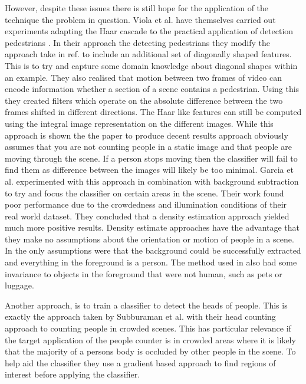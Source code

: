 \documentclass[conference]{IEEEtran}
\begin{document}
However, despite these issues there is still hope for the application of the technique the problem in question. Viola et al. have themselves carried out experiments adapting the Haar cascade to the practical application of detection pedestrians \cite{viola2003detecting}. In their approach the detecting pedestrians they modify the approach take in ref. \cite{viola2004robust} to include an additional set of diagonally shaped features. This is to try and capture some domain knowledge about diagonal shapes within an example. They also realised that motion between two frames of video can encode information whether a section of a scene contains a pedestrian. Using this they created filters which operate on the absolute difference between the two frames shifted in different directions. The Haar like features can still be computed using the integral image representation on the different images. While this approach is shown the the paper to produce decent results approach obviously assumes that you are not counting people in a static image and that people are moving through the scene. If a person stops moving then the classifier will fail to find them as difference between the images will likely be too minimal. Garcia et al. \cite{garcia2008effective} experimented with this approach in combination with background subtraction to try and focus the classifier on certain areas in the scene. Their work found poor performance due to the crowdedness and illumination conditions of their real world dataset. They concluded that a density estimation approach yielded much more positive results. Density estimate approaches have the advantage that they make no assumptions about the orientation or motion of people in a scene. In \cite{garcia2008effective} the only assumptions were that the background could be successfully extracted and everything in the foreground is a person. The method used in \cite{garcia2008effective} also had some invariance to objects in the foreground that were not human, such as pets or luggage.

Another approach, is to train a classifier to detect the heads of people. This is exactly the approach taken by Subburaman et al. \cite{subburaman2012counting} with their head counting approach to counting people in crowded scenes. This has particular relevance if the target application of the people counter is in crowded areas where it is likely that the majority of a persons body is occluded by other people in the scene. To help aid the classifier they use a gradient based approach to find regions of interest before applying the classifier.
\end{document}
